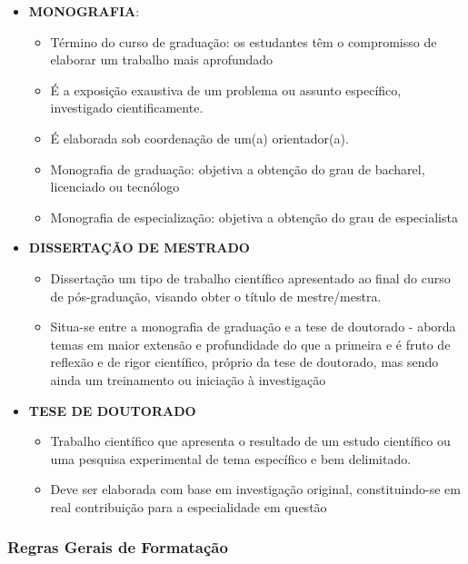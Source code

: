 \documentclass[
]{book}
\providecommand{\tightlist}{%
  \setlength{\itemsep}{0pt}\setlength{\parskip}{0pt}}
\begin{document}
\begin{itemize}
\tightlist
\item
  \textbf{MONOGRAFIA}:

  \begin{itemize}
  \tightlist
  \item
    Término do curso de graduação: os estudantes têm o compromisso de elaborar um trabalho mais aprofundado
  \item
    É a exposição exaustiva de um problema ou assunto específico, investigado cientificamente.
  \item
    É elaborada sob coordenação de um(a) orientador(a).
  \item
    Monografia de graduação: objetiva a obtenção do grau de bacharel, licenciado ou tecnólogo
  \item
    Monografia de especialização: objetiva a obtenção do grau de especialista
  \end{itemize}
\item
  \textbf{DISSERTAÇÃO DE MESTRADO}

  \begin{itemize}
  \tightlist
  \item
    Dissertação um tipo de trabalho científico apresentado ao final do curso de pós-graduação, visando obter o título de mestre/mestra.
  \item
    Situa-se entre a monografia de graduação e a tese de doutorado - aborda temas em maior extensão e profundidade do que a primeira e é fruto de reflexão e de rigor científico, próprio da tese de doutorado, mas sendo ainda um treinamento ou iniciação à investigação
  \end{itemize}
\item
  \textbf{TESE DE DOUTORADO}

  \begin{itemize}
  \tightlist
  \item
    Trabalho científico que apresenta o resultado de um estudo científico ou uma pesquisa experimental de tema específico e bem delimitado.
  \item
    Deve ser elaborada com base em investigação original, constituindo-se em real contribuição para a especialidade em questão
  \end{itemize}
\end{itemize}

\hypertarget{regras-gerais-de-formatauxe7uxe3o}{%
\subsubsection{Regras Gerais de Formatação}\label{regras-gerais-de-formatauxe7uxe3o}}
\end{document}
